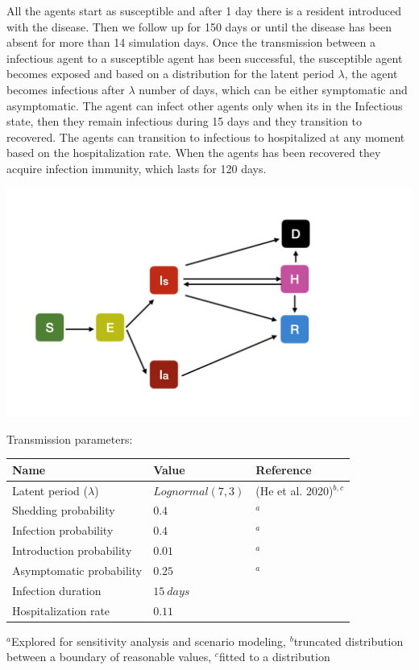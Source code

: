 \documentclass[
]{article}
\begin{document}
All the agents start as susceptible and after 1 day there is a resident
introduced with the disease. Then we follow up for 150 days or until the
disease has been absent for more than 14 simulation days. Once the
transmission between a infectious agent to a susceptible agent has been
successful, the susceptible agent becomes exposed and based on a
distribution for the latent period \(\lambda\), the agent becomes
infectious after \(\lambda\) number of days, which can be either
symptomatic and asymptomatic. The agent can infect other agents only
when its in the Infectious state, then they remain infectious during 15
days and they transition to recovered. The agents can transition to
infectious to hospitalized at any moment based on the hospitalization
rate. When the agents has been recovered they acquire infection
immunity, which lasts for 120 days.

\includegraphics{Figures/DiseaseDynamics}

Transmission parameters:

\begin{longtable}[]{@{}lll@{}}
\toprule
Name & Value & Reference\tabularnewline
\midrule
\endhead
Latent period (\(\lambda\)) & \(Lognormal(7, 3)\) & (He et al.
2020)\(^{b,c}\)\tabularnewline
Shedding probability & \(0.4\) & \(^a\)\tabularnewline
Infection probability & \(0.4\) & \(^a\)\tabularnewline
Introduction probability & \(0.01\) & \(^a\)\tabularnewline
Asymptomatic probability & \(0.25\) & \(^a\)\tabularnewline
Infection duration & \(15\ days\) &\tabularnewline
Hospitalization rate & \(0.11\) &\tabularnewline
\bottomrule
\end{longtable}

\(^a\)Explored for sensitivity analysis and scenario modeling,
\(^b\)truncated distribution between a boundary of reasonable values,
\(^c\)fitted to a distribution
\end{document}
